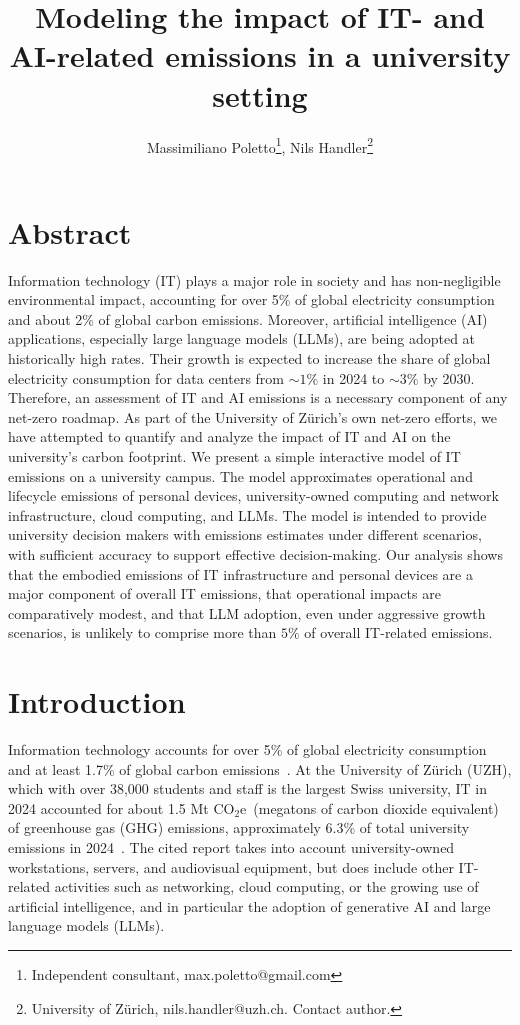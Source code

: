 \documentclass[11pt]{article}
\title{Modeling the impact of IT- and AI-related emissions in a university setting}
\author{Massimiliano Poletto\thanks{Independent consultant, max.poletto@gmail.com}, Nils Handler\thanks{University of Zürich, nils.handler@uzh.ch. Contact author.}}
\newcommand{\coe}{CO$_2$e}
\begin{document}
\maketitle

\section*{Abstract}
Information technology (IT) plays a major role in society and has non-negligible environmental impact, accounting for over 5\% of global electricity consumption and about 2\% of global carbon emissions. Moreover, artificial intelligence (AI) applications, especially large language models (LLMs), are being adopted at historically high rates. Their growth is expected to increase the share of global electricity consumption for data centers from $\sim 1\%$ in 2024 to $\sim 3\%$ by 2030. Therefore, an assessment of IT and AI emissions is a necessary component of any net-zero roadmap. As part of the University of Zürich's own net-zero efforts, we have attempted to quantify and analyze the impact of IT and AI on the university's carbon footprint. We present a simple interactive model of IT emissions on a university campus. The model approximates operational and lifecycle emissions of personal devices, university-owned computing and network infrastructure, cloud computing, and LLMs. The model is intended to provide university decision makers with emissions estimates under different scenarios, with sufficient accuracy to support effective decision-making. Our analysis shows that the embodied emissions of IT infrastructure and personal devices are a major component of overall IT emissions, that operational impacts are comparatively modest, and that LLM adoption, even under aggressive growth scenarios, is unlikely to comprise more than $5\%$ of overall IT-related emissions.

\section{Introduction}

Information technology accounts for over 5\% of global electricity consumption and at least 1.7\% of global carbon emissions~\cite{wb:itu:ict}. At the University of Zürich (UZH), which with over 38,000 students and staff is the largest Swiss university, IT in 2024 accounted for about 1.5 Mt \coe\ (megatons of carbon dioxide equivalent) of greenhouse gas (GHG) emissions, approximately 6.3\% of total university emissions in 2024~\cite{uzh:sustainability:report}. The cited report takes into account university-owned workstations, servers, and audiovisual equipment, but does include other IT-related activities such as networking, cloud computing, or the growing use of artificial intelligence, and in particular the adoption of generative AI and large language models (LLMs).
\end{document}
